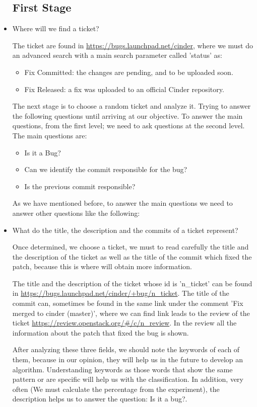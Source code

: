 \documentclass[a4paper]{article}
\begin{document}
\begin{itemize}
\subsection{First Stage}
\item Where will we find a ticket?

The ticket are found in \url{https://bugs.launchpad.net/cinder}, where we must do an advanced search with a main search parameter called 'status' as:
\begin{itemize}
    \item Fix Committed: the changes are pending, and to be uploaded soon.
    \item Fix Released: a fix was uploaded to an official Cinder repository.
\end{itemize}

The next stage is to choose a random ticket and analyze it. Trying to answer the following questions until arriving at our objective. To answer the main questions, from the first level; we need to ask questions at the second level.
The main questions are:
\begin{itemize}
    \item Is it a Bug?
    \item Can we identify the commit responsible for the bug?
    \item Is the previous commit responsible?
\end{itemize}

As we have mentioned before, to answer the main questions we need to answer other questions like the following:

\item What do the title, the description and the commits of a ticket represent?

Once determined, we choose a ticket, we must to read carefully the title and the description of the ticket as well as the title of the commit which fixed the patch, because this is where will obtain more information.

The title and the description of the ticket whose id is 'n\_ticket' can be found in \url{https://bugs.launchpad.net/cinder/+bug/n_ticket}. The title of the commit can, sometimes be found in the same link under the comment 'Fix merged to cinder (master)', where we can find link leads to the review of the ticket \url{https://review.openstack.org/#/c/n_review}. In the review all the information about the patch that fixed the bug is shown.

After analyzing these three fields,  we should note the keywords of each of them, because in our opinion, they will help us in the future to develop an algorithm. Understanding keywords as those words that show the same pattern or are specific will help us with the classification. In addition, very often (We must calculate the percentage from the experiment), the description helps us to answer the question: Is it a bug?.


\end{itemize}
\end{document}
